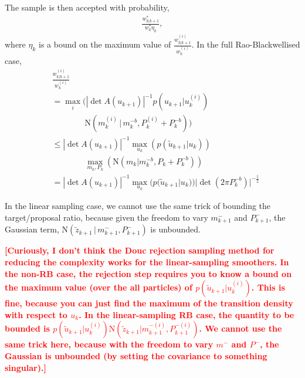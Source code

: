 \documentclass[twocolumn]{autart}    %
\newcommand{\comment}[1]{\textcolor{red}{\textbf{[#1]}}}
\begin{document}
The sample is then accepted with probability,
%
\begin{equation}
\begin{split}
  \frac{ w_{k|k+1}^* }{ w_k^* \eta_k }     ,
\end{split}
\end{equation}
%
where $\eta_k$ is a bound on the maximum value of $\frac{ w_{k|k+1}^{(i)} }{ w_k^{(i)} }$. In the full Rao-Blackwellised case,
%
\begin{equation}
\begin{split}
  & \frac{ w_{k|k+1}^{(i)} }{ w_k^{(i)} } \\
  & = \max_i( |\det A(u_{k+1})|^{-1} p(u_{k+1} | u_{k}^{(i)}) \\
  & \qquad \qquad \mathrm{N}(m_k^{(i)}\,|\,m^{-b}_{k},P_k^{(i)}+P^{-b}_{k})) \\
  & \le |\det A(u_{k+1})|^{-1} \max_{u_k}( p(\tilde{u}_{k+1} | u_k) ) \\
  & \qquad \qquad \max_{m_k,P_k}( \mathrm{N}(m_k | m^{-b}_{k},P_k+P^{-b}_{k}) ) \\
  & = |\det A(u_{k+1})|^{-1} \max_{u_k}( p(\tilde{u}_{k+1} | u_k) ) |\det(2 \pi P^{-b}_{k})|^{-\frac{1}{2}} 
\end{split}
\end{equation}

In the linear sampling case, we cannot use the same trick of bounding the target/proposal ratio, because given the freedom to vary $m^{-}_{k+1}$ and $P^{-}_{k+1}$, the Gaussian term, $\mathrm{N}(\tilde{z}_{k+1}\,|\, m^{-}_{k+1}, P^{-}_{k+1})$ is unbounded.

\comment{Curiously, I don't think the Douc rejection sampling method for reducing the complexity works for the linear-sampling smoothers. In the non-RB case, the rejection step requires you to know a bound on the maximum value (over the all particles) of $p(\tilde{u}_{k+1}|u_k^{(i)})$. This is fine, because you can just find the maximum of the transition density with respect to $u_k$. In the linear-sampling RB case, the quantity to be bounded is $p(\tilde{u}_{k+1}|u_k^{(i)}) \mathrm{N}(\tilde{z}_{k+1}|m^{-(i)}_{k+1}, P^{-(i)}_{k+1})$. We cannot use the same trick here, because with the freedom to vary $m^-$ and $P^-$, the Gaussian is unbounded (by setting the covariance to something singular).}

%
\end{document}
